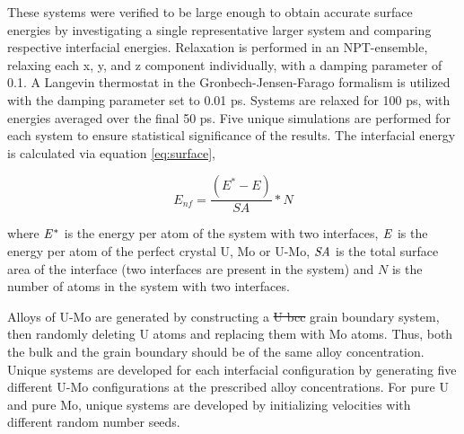 \documentclass[review]{elsarticle}
\providecommand{\DIFaddtex}[1]{{\protect\color{blue}\uwave{#1}}} %
\providecommand{\DIFdeltex}[1]{{\protect\color{red}\sout{#1}}}                      %
\providecommand{\DIFaddbegin}{} %
\providecommand{\DIFaddend}{} %
\providecommand{\DIFdelbegin}{} %
\providecommand{\DIFdelend}{} %
\providecommand{\DIFadd}[1]{\texorpdfstring{\DIFaddtex{#1}}{#1}} %
\providecommand{\DIFdel}[1]{\texorpdfstring{\DIFdeltex{#1}}{}} %
\newcommand{\DIFscaledelfig}{0.5}
\newlength{\DIFdelgraphicswidth} %
\newlength{\DIFdelgraphicsheight} %
\newcommand{\DIFaddincludegraphics}[2][]{{\color{blue}\fbox{\DIFOincludegraphics[#1]{#2}}}} %
\newcommand{\DIFdelincludegraphics}[2][]{%
\sbox{\DIFdelgraphicsbox}{\DIFOincludegraphics[#1]{#2}}%
\settoboxwidth{\DIFdelgraphicswidth}{\DIFdelgraphicsbox} %
\settoboxtotalheight{\DIFdelgraphicsheight}{\DIFdelgraphicsbox} %
\scalebox{\DIFscaledelfig}{%
\parbox[b]{\DIFdelgraphicswidth}{\usebox{\DIFdelgraphicsbox}\\[-\baselineskip] \rule{\DIFdelgraphicswidth}{0em}}\llap{\resizebox{\DIFdelgraphicswidth}{\DIFdelgraphicsheight}{%
\setlength{\unitlength}{\DIFdelgraphicswidth}%
\begin{picture}(1,1)%
\thicklines\linethickness{2pt} %
{\color[rgb]{1,0,0}\put(0,0){\framebox(1,1){}}}%
{\color[rgb]{1,0,0}\put(0,0){\line( 1,1){1}}}%
{\color[rgb]{1,0,0}\put(0,1){\line(1,-1){1}}}%
\end{picture}%
}\hspace*{3pt}}} %
} %
\DeclareRobustCommand{\DIFaddbegin}{\DIFOaddbegin \let\includegraphics\DIFaddincludegraphics} %
\DeclareRobustCommand{\DIFaddend}{\DIFOaddend \let\includegraphics\DIFOincludegraphics} %
\DeclareRobustCommand{\DIFdelbegin}{\DIFOdelbegin \let\includegraphics\DIFdelincludegraphics} %
\DeclareRobustCommand{\DIFdelend}{\DIFOaddend \let\includegraphics\DIFOincludegraphics} %
\begin{document}
These systems were verified to be large enough to obtain accurate surface energies by investigating a single representative larger system and comparing respective interfacial energies. Relaxation is performed in an NPT-ensemble, relaxing each x, y, and z component individually, with a damping parameter of 0.1. A Langevin thermostat in the Gronbech-Jensen-Farago \cite{gjf2014} formalism is utilized with the damping parameter set to 0.01 ps. Systems are relaxed for 100 ps, with energies averaged over the final 50 ps. Five unique simulations are performed for each system to ensure statistical significance of the results. The interfacial energy is calculated via equation \ref{eq:surface},

\begin{equation}
\label{eq:surface}
E_{nf}= \frac{(E^{*} - E)}{SA} * N
\end{equation}

where $\it{E^{*}}$ is the energy per atom of the system with two interfaces, $\it{E}$ is the energy per atom of the perfect crystal U, Mo or U-Mo, $\it{SA}$ is the total surface area of the interface (two interfaces are present in the system) and $\textit{N}$ is the number of atoms in the system with two interfaces. 

Alloys of U-Mo are generated by constructing a \DIFdelbegin \DIFdel{U bcc }\DIFdelend \DIFaddbegin \DIFadd{bcc U }\DIFaddend grain boundary system, then randomly deleting U atoms and replacing them with Mo atoms. Thus, both the bulk and the grain boundary should be of the same alloy concentration. Unique systems are developed for each interfacial configuration by generating five different U-Mo configurations at the prescribed alloy concentrations. For pure U and pure Mo, unique systems are developed by initializing velocities with different random number seeds. 

\DIFaddbegin \subsection{\DIFadd{Mo depletion at interfaces}}
\end{document}

